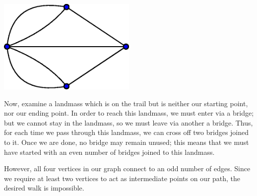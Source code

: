 \documentclass[11pt]{article}
\theoremstyle{definition}
\theoremstyle{remark}
\numberwithin{equation}{section}
\begin{document}
    \begin{center}
        \includegraphics[width=0.5\textwidth]{7_bridges_graph.eps}
    \end{center}

    Now, examine a landmass which is on the trail but is neither our starting point,
    nor our ending point. In order to reach this landmass, we must enter via a bridge; but
    we cannot stay in the landmass, so we must leave via another a bridge. Thus, for
    each time we pass through this landmass, we can cross off two bridges joined to
    it. Once we are done, no bridge may remain unused; this means that we must have
    started with an even number of bridges joined to this landmass.

    However, all four vertices in our graph connect to an odd number of edges. Since
    we require at least two vertices to act as intermediate points on our path, the
    desired walk is impossible.
\end{document}
